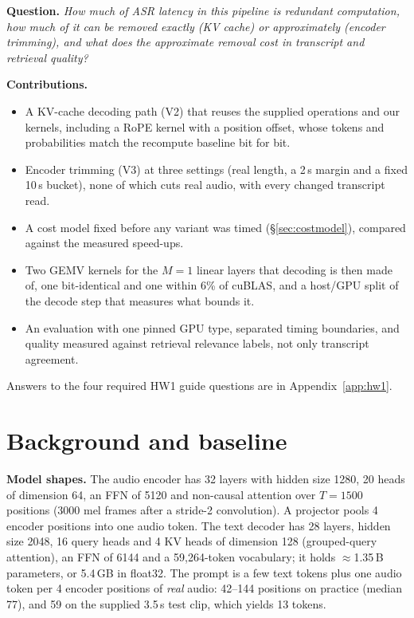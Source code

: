 \documentclass{article}
\begin{document}
\textbf{Question.} \emph{How much of ASR latency in this pipeline is redundant
computation, how much of it can be removed exactly (KV cache) or approximately
(encoder trimming), and what does the approximate removal cost in transcript and
retrieval quality?}

\textbf{Contributions.}
\begin{itemize}
  \item A KV-cache decoding path (V2) that reuses the supplied operations and our
        kernels, including a RoPE kernel with a position offset, whose tokens and
        probabilities match the recompute baseline bit for bit.
  \item Encoder trimming (V3) at three settings (real length, a 2\,s margin and a fixed
        10\,s bucket), none of which cuts real audio, with every changed transcript read.
  \item A cost model fixed before any variant was timed (\S\ref{sec:costmodel}), compared
        against the measured speed-ups.
  \item Two GEMV kernels for the $M=1$ linear layers that decoding is then made of, one
        bit-identical and one within 6\% of cuBLAS, and a host/GPU split of the decode step
        that measures what bounds it.
  \item An evaluation with one pinned GPU type, separated timing boundaries, and
        quality measured against retrieval relevance labels, not only transcript agreement.
\end{itemize}
Answers to the four required HW1 guide questions are in Appendix~\ref{app:hw1}.

\section{Background and baseline}
\label{sec:background}

\textbf{Model shapes.} The audio encoder has 32 layers with hidden size 1280,
20 heads of dimension 64, an FFN of 5120 and non-causal attention over $T=1500$
positions (3000 mel frames after a stride-2 convolution). A projector pools 4
encoder positions into one audio token. The text decoder has 28 layers, hidden size
2048, 16 query heads and 4 KV heads of dimension 128 (grouped-query attention),
an FFN of 6144 and a 59{,}264-token vocabulary; it holds $\approx$1.35\,B parameters,
or 5.4\,GB in float32. The prompt is a few text tokens plus one audio token per 4
encoder positions of \emph{real} audio: 42--144 positions on practice (median 77), and
59 on the supplied 3.5\,s test clip, which yields 13 tokens.
\end{document}
